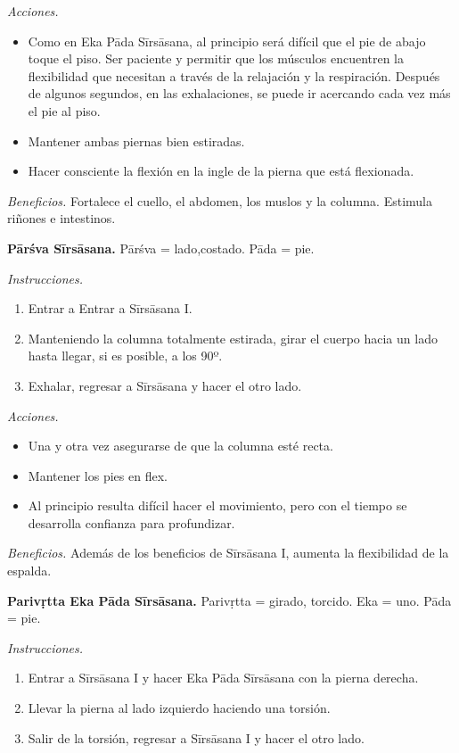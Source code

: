 \emph{Acciones.}
\begin{itemize}
\item Como en Eka Pāda Sīrsāsana, al
principio será difícil que el pie de abajo
toque el piso. Ser paciente y permitir que
los músculos encuentren la flexibilidad que
necesitan a través de la relajación y la
respiración. Después de algunos segundos, en
las exhalaciones, se puede ir acercando cada
vez más el pie al piso.
\item Mantener ambas piernas bien estiradas.
\item Hacer consciente la flexión en la ingle
de la pierna que está flexionada.
\end{itemize}

\emph{Beneficios.} Fortalece el cuello, el
abdomen, los muslos y la columna. Estimula
riñones e intestinos.

\medskip\noindent\textbf{Pārśva Sīrsāsana.}
Pārśva = lado,costado. Pāda = pie.

\emph{Instrucciones.}
\begin{enumerate}
\item Entrar a Entrar a Sīrsāsana I.
\item Manteniendo la columna totalmente
estirada, girar el cuerpo hacia un lado hasta
llegar, si es posible, a los 90º.
\item Exhalar, regresar a Sīrsāsana y hacer
el otro lado.
\end{enumerate}

\emph{Acciones.}
\begin{itemize}
\item Una y otra vez asegurarse de que la
columna esté recta.
\item Mantener los pies en flex.
\item Al principio resulta difícil hacer el
movimiento, pero con el tiempo se desarrolla
confianza para profundizar.
\end{itemize}

\emph{Beneficios.} Además de los beneficios
de Sīrsāsana I, aumenta la flexibilidad de la
espalda.

\medskip\noindent\textbf{Parivṛtta Eka Pāda
Sīrsāsana.}
Parivṛtta = girado, torcido. Eka = uno. Pāda
= pie.

\emph{Instrucciones.}
\begin{enumerate}
\item Entrar a Sīrsāsana I y hacer Eka Pāda
Sīrsāsana con la pierna derecha.
\item Llevar la pierna al lado izquierdo
haciendo una torsión.
\item Salir de la torsión, regresar a
Sīrsāsana I y hacer el otro lado.
\end{enumerate}

